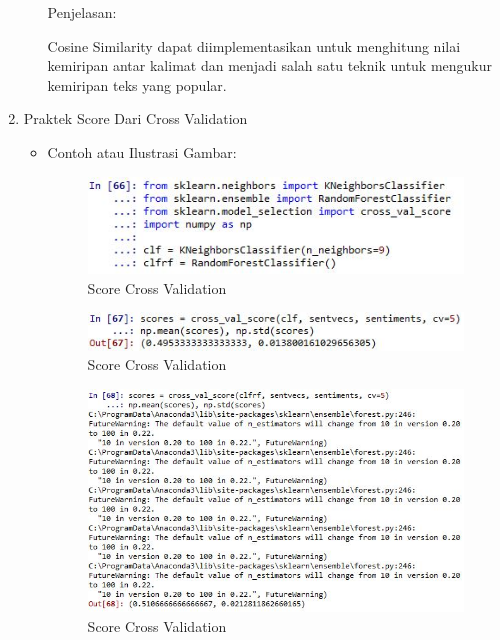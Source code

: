 \begin{enumerate}
\begin{itemize}
Penjelasan: 

Cosine Similarity dapat diimplementasikan untuk menghitung nilai kemiripan antar kalimat dan menjadi salah satu teknik untuk mengukur kemiripan  teks yang  popular. 

\end{itemize}

\item Praktek Score Dari Cross Validation
\begin{itemize}
\item Contoh atau Ilustrasi Gambar:

\begin{figure}[!hbtp]
\centering
\includegraphics[scale=0.7]{figures/1174031/5/56.jpg}
\caption{Score Cross Validation}
\label{Score Cross Validation}
\end{figure}

\begin{figure}[!hbtp]
\centering
\includegraphics[scale=0.7]{figures/1174031/5/57.jpg}
\caption{Score Cross Validation}
\label{Score Cross Validation}
\end{figure}

\begin{figure}[!hbtp]
\centering
\includegraphics[scale=0.7]{figures/1174031/5/58.jpg}
\caption{Score Cross Validation}
\label{Score Cross Validation}
\end{figure}


\end{itemize}
\end{enumerate}
